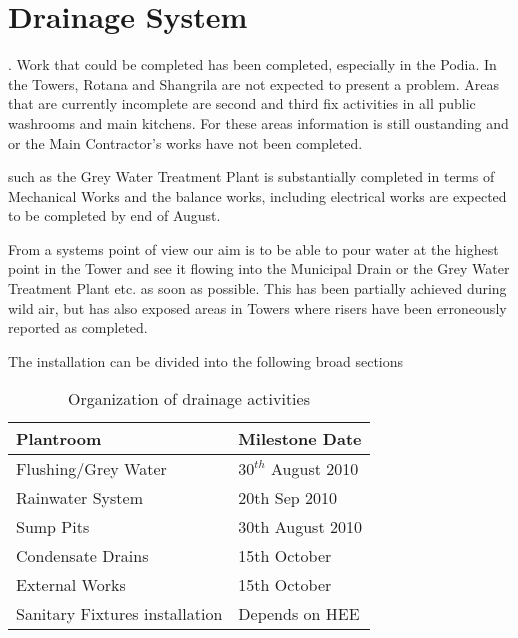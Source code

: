 \chapter{Drainage System}

. Work that could be completed has been completed, especially in the Podia. In the Towers, Rotana and Shangrila are not expected to present a problem. Areas that are currently incomplete are second and third fix activities
in all public washrooms and main kitchens. For these areas information is still oustanding and or the Main Contractor's works have not been completed. 

 such as the Grey Water Treatment Plant is substantially completed in terms of Mechanical Works and the balance works, including electrical works are expected to be completed by end of August.

From a systems point of view our aim is to be able to pour water at the highest point
in the Tower and see it flowing into the Municipal Drain or the Grey Water Treatment Plant etc.
as soon as possible. This has been partially achieved during wild air, but has also exposed areas in Towers where risers have been erroneously reported as completed.

The installation can be divided into the following broad sections

	\begin{center}
           \begin{table} 
	    \begin{tabular}{ll}
	      \toprule
	      Plantroom   &  Milestone Date  \\
	      \midrule
	      Flushing/Grey Water       &    $30^{th}$ August 2010  \\
	      Rainwater System      &    20th Sep 2010  \\
	      Sump Pits    &    30th August 2010  \\
	     Condensate Drains &15th October\\
	     External Works &15th October \\
	     Sanitary Fixtures installation &Depends on HEE \\ 
	      \bottomrule
	    \end{tabular}
             \caption{Organization of drainage activities}
             \end{table}
          \end{center}


